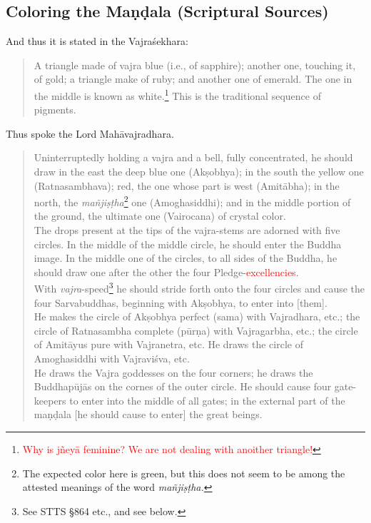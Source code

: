 \documentclass[11pt]{book}
\newcommand{\red}[1]{\textcolor{red}{#1}}
\begin{document}
\subsection{Coloring the Maṇḍala (Scriptural Sources)}
And thus it is stated in the Vajraśekhara:

\begin{verse}
A triangle made of vajra blue (i.e., of sapphire); another one, touching it, of gold; a triangle make of ruby; and another one of emerald. The one in the middle is known as white.\footnote{\red{Why is jñeyā feminine? We are not dealing with anoither triangle!}} This is the traditional sequence of pigments.
\end{verse}

\noindent
Thus spoke the Lord Mahāvajradhara.

\begin{verse}
Uninterruptedly holding a vajra and a bell, fully concentrated, he should draw in the east the deep blue one (Akṣobhya); in the south the yellow one (Ratnasambhava); red, the one whose part is west (Amitābha); in the north, the \emph{mañjiṣṭha}\footnote{The expected color here is green, but this does not seem to be among the attested meanings of the word \emph{mañjiṣṭha.}} one (Amoghasiddhi); and in the middle portion of the ground, the ultimate one (Vairocana) of crystal color.\\
The drops present at the tips of the vajra-stems are adorned with five circles. In the middle of the middle circle, he should enter the Buddha image. In the middle one of the circles, to all sides of the Buddha, he should draw one after the other the four Pledge-\red{excellencies}.\\
With \emph{vajra}-speed\footnote{See STTS §864 etc., and see below.} he should stride forth onto the four circles and cause the four Sarvabuddhas, beginning with Akṣobhya, to enter into [them].\\
He makes the circle of Akṣobhya perfect (sama) with Vajradhara, etc.; the circle of Ratnasambha complete (pūrṇa) with Vajragarbha, etc.; the circle of Amitāyus pure with Vajranetra, etc. He draws the circle of Amoghasiddhi with Vajraviśva, etc.\\
He draws the Vajra goddesses on the four corners; he draws the Buddhapūjās on the cornes of the outer circle. He should cause four gate-keepers to enter into the middle of all gates; in the external part of the maṇḍala [he should cause to enter] the great beings.
\end{verse}
\end{document}
